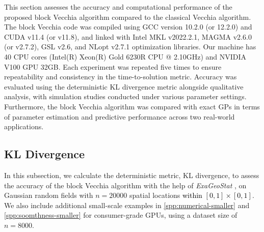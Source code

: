 \documentclass[12pt]{article}
\begin{document}
This section assesses the accuracy and computational performance of the proposed block Vecchia algorithm compared to the classical Vecchia algorithm. The block Vecchia code was compiled using GCC version 10.2.0 (or 12.2.0) and CUDA  v11.4 (or v11.8), and linked with Intel MKL v2022.2.1, MAGMA v2.6.0 (or v2.7.2), GSL v2.6, and NLopt v2.7.1 optimization libraries. Our machine has 40 CPU cores (Intel(R) Xeon(R) Gold 6230R CPU @ 2.10GHz) and NVIDIA V100 GPU 32GB. Each experiment was repeated five times to ensure repeatability and consistency in the time-to-solution metric. Accuracy was evaluated using the deterministic KL divergence metric alongside qualitative analysis, with simulation studies conducted under various parameter settings. Furthermore, the block Vecchia algorithm was compared with exact GPs in terms of parameter estimation and predictive performance across two real-world applications. 
\subsection{KL Divergence}

In this subsection, we calculate the deterministic metric, KL divergence, to assess the accuracy of the block Vecchia algorithm with the help of {\em ExaGeoStat} \citep{abdulah2018exageostat}, on Gaussian random fields with $n=20000$ spatial locations \textcolor{black}{ within $[0, 1] \times [0, 1]$}. We also include additional small-scale examples in \ref{spp:numerical-smaller} and \ref{spp:soomthness-smaller} for consumer-grade GPUs, using a dataset size of $n = 8000$.
\end{document}
